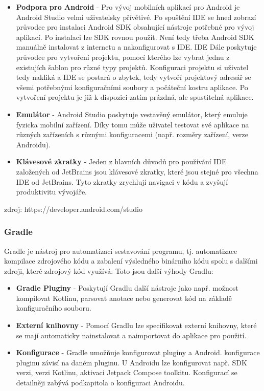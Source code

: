 \begin{itemize}
	\item \textbf{Podpora pro Android} - Pro vývoj mobilních aplikací pro Android je Android Studio velmi uživatelsky přívětivé. Po spuštění IDE se hned zobrazí průvodce pro instalaci Android SDK obsahující nástroje potřebné pro vývoj aplikací. Po instalaci lze SDK rovnou použít. Není tedy třeba Android SDK manuálně instalovat z internetu a nakonfigurovat s IDE. IDE Dále poskytuje průvodce pro vytvoření projektu, pomocí kterého lze vybrat jednu z existujích šablon pro různé typy projektů. Konfiguraci projektu si uživatel tedy nakliká a IDE se postará o zbytek, tedy vytvoří projektový adresář se všemi potřebnými konfiguračními soubory a počáteční kostru aplikace. Po vytvoření projektu je již k dispozici zatím prázdná, ale spustitelná aplikace.
	
	\item \textbf{Emulátor} - Android Studio poskytuje vestavěný emulátor, který emuluje fyzicka mobilní zařízení. Díky tomu může uživatel testovat své aplikace na různých zařízeních s různými konfiguracemi (např. rozměry zařízení, verze Androidu).
		
	\item \textbf{Klávesové zkratky} - Jeden z hlavních důvodů pro používání IDE založených od JetBrains jsou klávesové zkratky, které jsou stejné pro všechna IDE od JetBrains. Tyto zkratky zrychlují navigaci v kódu a zvyšují produktivitu vývojáře.
\end{itemize}

\noindent zdroj: https://developer.android.com/studio

\subsubsection *{Gradle}
Gradle je nástroj pro automatizaci sestavování programu, tj. automatizace kompilace zdrojového kódu a zabalení výsledného binárního kódu spolu s dalšími zdroji, které zdrojový kód využívá. Toto jsou další výhody Gradlu: 

\begin{itemize}
	\item \textbf{Gradle Pluginy} - Poskytují Gradlu další nástroje jako např. možnost kompilovat Kotlinu, parsovat anotace nebo generovat kód na základě konfiguračního souboru. 
	
	\item \textbf{Externí knihovny} - Pomocí Gradlu lze specifikovat externí knihovny, které se mají automaticky nainstalovat a naimportovat do aplikace pro použití.
	
	\item \textbf{Konfigurace} - Gradle umožňuje konfigurovat pluginy a Android. konfigurace pluginu závisí na daném pluginu. U Androidu lze konfigurovat např. SDK verzi, verzi Kotlinu, aktivaci Jetpack Compose toolkitu. Konfigurací se detailněji zabývá podkapitola o konfiguraci Androidu.
\end{itemize}

